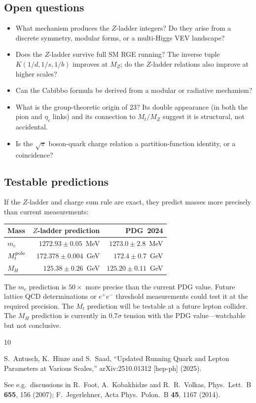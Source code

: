 \documentclass[11pt]{article}
\begin{document}
\subsection{Open questions}

\begin{itemize}
  \item What mechanism produces the $Z$-ladder integers?
    Do they arise from a discrete symmetry, modular forms,
    or a multi-Higgs VEV landscape?
  \item Does the $Z$-ladder survive full SM RGE running?
    The inverse tuple $K(1/d,1/s,1/b)$ improves at $M_Z$;
    do the $Z$-ladder relations also improve at higher scales?
  \item Can the Cabibbo formula be derived from a modular
    or radiative mechanism?
  \item What is the group-theoretic origin of $23$?
    Its double appearance (in both the pion and $\eta_c$ links)
    and its connection to $M_t/M_Z$ suggest it is structural,
    not accidental.
  \item Is the $\sqrt{\pi}$ boson-quark charge relation
    a partition-function identity, or a coincidence?
\end{itemize}

\subsection{Testable predictions}

If the $Z$-ladder and charge sum rule are exact, they predict
masses more precisely than current measurements:

\begin{center}\small
\begin{tabular}{@{}l r r@{}}
\toprule
Mass & $Z$-ladder prediction & PDG~2024 \\
\midrule
$m_c$ & $1272.93 \pm 0.05$~MeV & $1273.0\pm 2.8$~MeV \\
$M_t^{\rm pole}$ & $172.378 \pm 0.004$~GeV & $172.4\pm 0.7$~GeV \\
$M_H$ & $125.38 \pm 0.26$~GeV & $125.20\pm 0.11$~GeV \\
\bottomrule
\end{tabular}
\end{center}

\noindent
The $m_c$ prediction is $50\times$ more precise than the
current PDG value.  Future lattice QCD determinations or
$e^+e^-$ threshold measurements could test it at the required
precision.  The $M_t$ prediction will be testable at a future
lepton collider.  The $M_H$ prediction is currently in
$0.7\sigma$ tension with the PDG value---watchable but not
conclusive.

\begin{thebibliography}{10}

S.~Antusch, K.~Hinze and S.~Saad,
``Updated Running Quark and Lepton Parameters at Various Scales,''
arXiv:2510.01312 [hep-ph] (2025).

See e.g.\ discussions in R.~Foot, A.~Kobakhidze and R.~R.~Volkas,
Phys.\ Lett.\ B \textbf{655}, 156 (2007);
F.~Jegerlehner, Acta Phys.\ Polon.\ B \textbf{45}, 1167 (2014).

\end{thebibliography}
\end{document}
